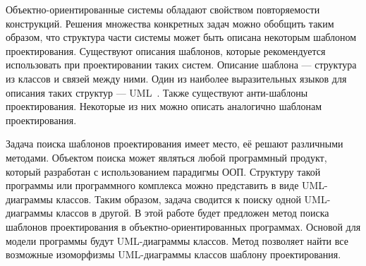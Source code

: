 \Introduction

Объектно-ориентированные системы обладают свойством повторяемости конструкций.
Решения множества конкретных задач можно обобщить таким образом,
что структура части системы может быть описана некоторым шаблоном проектирования.
Существуют описания шаблонов, которые рекомендуется использовать при
проектировании таких систем.
Описание шаблона --- структура из классов и связей между ними.
Один из наиболее выразительных языков для описания таких структур ---
UML~\cite{UMLSuperstructure}.
Также существуют анти-шаблоны проектирования.
Некоторые из них можно описать аналогично шаблонам проектирования.

Задача поиска шаблонов проектирования имеет место, её решают различными методами.
Объектом поиска может являться любой программный продукт, который разработан с
использованием парадигмы ООП.
Структуру такой программы или программного комплекса можно представить в виде
UML-диаграммы классов.
Таким образом, задача сводится к поиску одной UML-диаграммы классов в другой.
В этой работе будет предложен метод поиска шаблонов проектирования в
объектно-ориентированных программах.
Основой для модели программы будут UML-диаграммы классов.
Метод позволяет найти все возможные изоморфизмы UML-диаграммы классов шаблону
проектирования.
